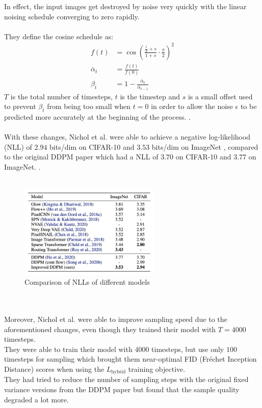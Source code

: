 \documentclass{article}
\begin{document}
In effect, the input images get destroyed by noise very quickly with the linear noising schedule converging to zero rapidly. \cite{nichol2021improved}
\\\\
They define the cosine schedule as:
\begin{align}
  f(t) &= \cos \left( \frac{\frac{t}{T} + s}{1 + s} \cdot \frac{\pi}{2} \right)^2 \\
  \bar{\alpha}_t &= \frac{f(t)}{f(0)} \\
  \beta_t &= 1 - \frac{\bar{\alpha}_t}{\bar{\alpha}_{t-1}}
\end{align}
$T$ is the total number of timesteps, $t$ is the timestep and $s$ is a small offset used to prevent $\beta_t$ from being too small when $t = 0$ in order to allow the noise $\epsilon$ to be predicted more accurately at the beginning of the process. \cite{nichol2021improved}.
\\\\
With these changes, Nichol et al. \cite{nichol2021improved} were able to achieve a negative log-likelihood (NLL) of $2.94$ bits/dim on CIFAR-10 \cite{cifar10} and $3.53$ bits/dim on ImageNet \cite{oord2016conditional}, compared to the original DDPM paper \cite{ho2020denoising} which had a NLL of $3.70$ on CIFAR-10 and $3.77$ on ImageNet. \cite{nichol2021improved}.
\\\\
\begin{figure}[h]
  \begin{center}
    \includegraphics[width= 0.6\textwidth]{images/comparison.png}
    \caption{Comparison of NLLs of different models \cite{nichol2021improved}}
  \end{center}
\end{figure}
\\\\
Moreover, Nichol et al. \cite{nichol2021improved} were able to improve sampling speed due to the aforementioned changes, even though they trained their model with $T = 4000$ timesteps. \\
They were able to train their model with $4000$ timesteps, but use only $100$ timesteps for sampling which brought them near-optimal FID (Fréchet Inception Distance) scores when using the $L_{\text{hybrid}}$ training objective. \cite{nichol2021improved} \\
They had tried to reduce the number of sampling steps with the original fixed variance versions from the DDPM paper \cite{ho2020denoising} but found that the sample quality degraded a lot more. \cite{nichol2021improved}
\end{document}
